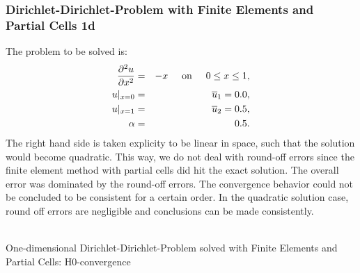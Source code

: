 \documentclass[a4paper,12pt]{article}
\makeatletter
\newenvironment{figurehere}
  {\def\@captype{figure}}
  {}
\makeatother
\begin{document}
\subsubsection{Dirichlet-Dirichlet-Problem with Finite Elements and Partial Cells 1d}
The problem to be solved is:
\begin{eqnarray}
\frac{\partial^2 u}{\partial x^2} &=& -x \hspace{0.5cm}\text{on}\hspace{0.5cm}0 \leq x\leq 1,\\
u\vert_{x=0} &=& \overline{u}_1 = 0.0,\\
u\vert_{x=1} &=& \overline{u}_2 = 0.5,\\
\alpha &=& 0.5.
\end{eqnarray}
The right hand side is taken explicity to be linear in space, such that the solution would become quadratic. This way, we do
not deal with round-off errors since the finite element method with partial cells did hit the exact solution. The overall error
was dominated by the round-off errors. The convergence behavior could not be concluded to be consistent for a certain order. In the quadratic solution case, round off errors are negligible and conclusions can be made
consistently.
\begin{center}
\begin{figurehere}
\\
\caption{One-dimensional Dirichlet-Dirichlet-Problem solved with Finite Elements and Partial Cells: H$0$-convergence}\label{fig:femdirichlet1dH0}
\end{figurehere}
\end{center}
\end{document}
